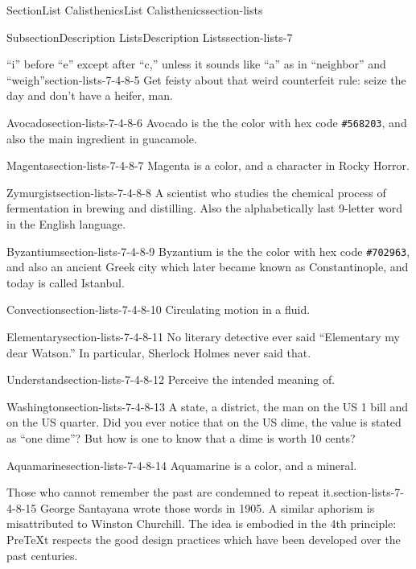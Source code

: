 \documentclass[twoside,10pt,]{article}
\newcommand{\mono}[1]{\texttt{#1}}
\numberwithin{equation}{section}
\begin{document}
\begin{sectionptx}{Section}{List Calisthenics}{}{List Calisthenics}{}{}{section-lists}
\begin{subsectionptx}{Subsection}{Description Lists}{}{Description Lists}{}{}{section-lists-7}
\begin{descriptionlist}
\begin{dlinarrow}{``i'' before ``e'' except after ``c,'' unless it sounds like ``a'' as in ``neighbor'' and ``weigh''}{section-lists-7-4-8-5}
Get feisty about that weird counterfeit rule: seize the day and don't have a heifer, man.%
\end{dlinarrow}%
\begin{dlinarrow}{Avocado}{section-lists-7-4-8-6}%
Avocado is the the color with hex code \mono{\#568203}, and also the main ingredient in guacamole.%
\end{dlinarrow}%
\begin{dlinarrow}{Magenta}{section-lists-7-4-8-7}%
Magenta is a color, and a character in Rocky Horror.%
\end{dlinarrow}%
\begin{dlinarrow}{Zymurgist}{section-lists-7-4-8-8}%
A scientist who studies the chemical process of fermentation in brewing and distilling.  Also the alphabetically last 9-letter word in the English language.%
\end{dlinarrow}%
\begin{dlinarrow}{Byzantium}{section-lists-7-4-8-9}%
Byzantium is the the color with hex code \mono{\#702963}, and also an ancient Greek city which later became known as Constantinople, and today is called Istanbul.%
\end{dlinarrow}%
\begin{dlinarrow}{Convection}{section-lists-7-4-8-10}%
Circulating motion in a fluid.%
\end{dlinarrow}%
\begin{dlinarrow}{Elementary}{section-lists-7-4-8-11}%
No literary detective ever said ``Elementary my dear Watson.''  In particular, Sherlock Holmes never said that.%
\end{dlinarrow}%
\begin{dlinarrow}{Understand}{section-lists-7-4-8-12}%
Perceive the intended meaning of.%
\end{dlinarrow}%
\begin{dlinarrow}{Washington}{section-lists-7-4-8-13}%
A state, a district, the man on the US \textdollar{}1 bill and on the US quarter. Did you ever notice that on the US dime, the value is stated as ``one dime''? But how is one to know that a dime is worth 10 cents?%
\end{dlinarrow}%
\begin{dlinarrow}{Aquamarine}{section-lists-7-4-8-14}%
Aquamarine is a color, and a mineral.%
\end{dlinarrow}%
\begin{dlinarrow}{Those who cannot remember the past are condemned to repeat it.}{section-lists-7-4-8-15}%
George Santayana wrote those words in 1905.  A similar aphorism is misattributed to Winston Churchill.  The idea is embodied in the 4th principle: PreTeXt respects the good design practices which have been developed over the past centuries.%

\end{dlinarrow}
\end{descriptionlist}
\end{subsectionptx}
\end{sectionptx}
\end{document}
